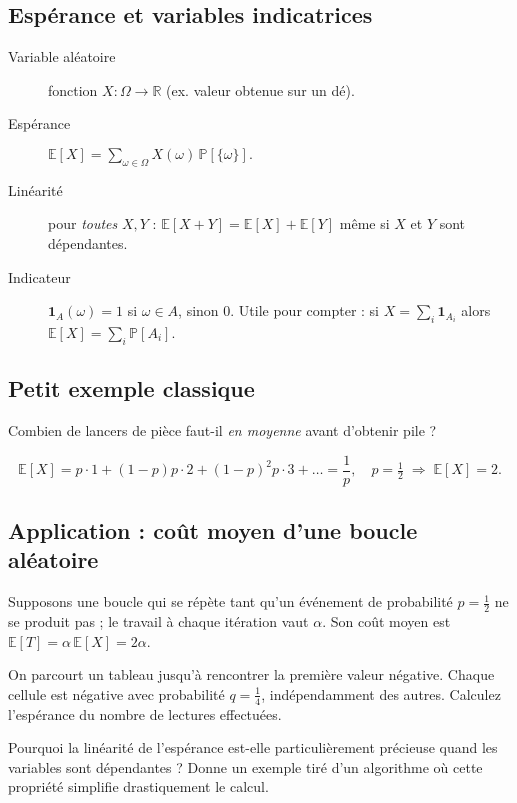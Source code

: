 \subsection{Espérance et variables indicatrices}
\begin{description}
  \item[Variable aléatoire] fonction $X:\Omega\to\mathbb{R}$ (ex. valeur
        obtenue sur un dé).
  \item[Espérance] \(\displaystyle \mathbb{E}[X]=\sum_{\omega\in\Omega}
        X(\omega)\,\mathbb{P}[\{\omega\}].\)
  \item[Linéarité] pour \emph{toutes} $X,Y$ :
        \(\mathbb{E}[X+Y]=\mathbb{E}[X]+\mathbb{E}[Y]\) même si $X$ et $Y$
        sont dépendantes.
  \item[Indicateur] \(\mathbf{1}_{A}(\omega)=1\) si $\omega\in A$, sinon 0.
        Utile pour compter : si $X=\sum_i \mathbf{1}_{A_i}$ alors
        \(\mathbb{E}[X]=\sum_i \mathbb{P}[A_i]\).
\end{description}

\subsection{Petit exemple classique}
Combien de lancers de pièce faut-il \emph{en moyenne} avant d’obtenir pile ?

\[
\mathbb{E}[X] = p\cdot1 + (1-p)p\cdot2 + (1-p)^{2}p\cdot3+\dots
              = \frac{1}{p},
\quad p=\tfrac12 \;\Rightarrow\; \mathbb{E}[X]=2.
\]

\subsection{Application : coût moyen d’une boucle aléatoire}
Supposons une boucle qui se répète tant qu’un événement de probabilité
\(p=\tfrac12\) ne se produit pas ; le travail à chaque itération vaut
\(\alpha\).  Son coût moyen est
\(\mathbb{E}[T]=\alpha\,\mathbb{E}[X]=2\alpha\).

\begin{exercice}
On parcourt un tableau jusqu’à rencontrer la première valeur négative.
Chaque cellule est négative avec probabilité $q=\tfrac14$, indépendamment
des autres.  Calculez l’espérance du nombre de lectures effectuées.
\end{exercice}

\begin{reflexion}
Pourquoi la linéarité de l’espérance est-elle particulièrement précieuse
quand les variables sont dépendantes ?  Donne un exemple tiré d’un
algorithme où cette propriété simplifie drastiquement le calcul.
\end{reflexion}

